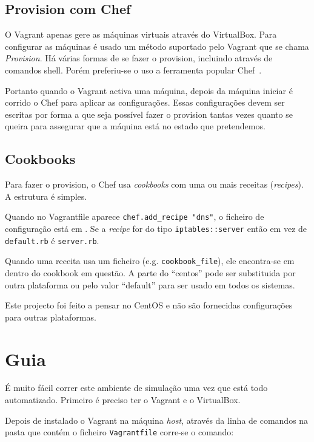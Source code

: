 \documentclass[12pt,a4paper]{report}
\begin{document}
\section{Provision com Chef}

O Vagrant apenas gere as máquinas virtuais através do VirtualBox. Para configurar as máquinas é usado um método suportado pelo Vagrant que se chama \emph{Provision}. Há várias formas de se fazer o provision, incluindo através de comandos shell. Porém preferiu-se o uso a ferramenta popular Chef~\cite{Chef}. 

Portanto quando o Vagrant activa uma máquina, depois da máquina iniciar é corrido o Chef para aplicar as configurações. Essas configurações devem ser escritas por forma a que seja possível fazer o provision tantas vezes quanto se queira para assegurar que a máquina está no estado que pretendemos.

\section{Cookbooks}

Para fazer o provision, o Chef usa \emph{cookbooks} com uma ou mais receitas (\emph{recipes}). A estrutura é simples.

Quando no Vagrantfile aparece \verb+chef.add_recipe "dns"+, o ficheiro de configuração está em . Se a \emph{recipe} for do tipo \texttt{iptables::server} então em vez de \texttt{default.rb} é \texttt{server.rb}.

Quando uma receita usa um ficheiro (e.g. \verb+cookbook_file+), ele encontra-se em  dentro do cookbook em questão. A parte do ``centos'' pode ser substituida por outra plataforma ou pelo valor ``default'' para ser usado em todos os sistemas.

Este projecto foi feito a pensar no CentOS e não são fornecidas configurações para outras plataformas.

\chapter{Guia}

É muito fácil correr este ambiente de simulação uma vez que está todo automatizado. Primeiro é preciso ter o Vagrant e o VirtualBox.

Depois de instalado o Vagrant na máquina \emph{host}, através da linha de comandos na pasta que contém o ficheiro \texttt{Vagrantfile} corre-se o comando:
\end{document}
